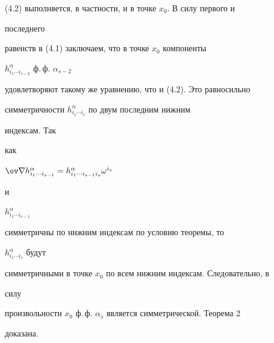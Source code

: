 (4.2) выполняется, в частности, и в точке $x_0$. В силу первого и 


последнего 


равенств в (4.1) заключаем, что в точке $x_0$ компоненты 


$h^\alpha_{i_1\dotsb i_{s-2}}$ ф.\,ф. $\alpha_{s-2}$ 


удовлетворяют такому же уравнению, что и (4.2). Это равносильно 


симметричности $h^\alpha_{i_1\dotsb i_s}$ по двум последним нижним 


индексам. Так 


как 


$\ov\na h^\alpha_{i_1\dotsb i_{s-1}}= 


h^\alpha_{i_1\dotsb i_{s-1}i_s}\omega^{i_s}$ 


и 


$h^\alpha_{i_1\dotsb i_{s-1}}$ 


симметричны по нижним индексам по условию теоремы, то 


$h^\alpha_{i_1\dotsb i_{s}}$ будут 


симметричными в точке $x_0$ по всем нижним индексам. Следовательно, в 


силу 


произвольности $x_0$ ф.\,ф. $\alpha_s$ является симметрической. Теорема 2 


доказана. 


 


 



